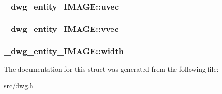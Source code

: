 \hypertarget{struct__dwg__entity__IMAGE_ab37550b0d4eb6c4e1899fd327a4c7917}{
\subsubsection[{uvec}]{ {\bf \-\_\-dwg\-\_\-entity\-\_\-\-I\-M\-A\-G\-E\-::uvec}}}\label{struct__dwg__entity__IMAGE_ab37550b0d4eb6c4e1899fd327a4c7917}
\hypertarget{struct__dwg__entity__IMAGE_a4cdf679c7f260a8799bbb15a80fde48f}{
\subsubsection[{vvec}]{ {\bf \-\_\-dwg\-\_\-entity\-\_\-\-I\-M\-A\-G\-E\-::vvec}}}\label{struct__dwg__entity__IMAGE_a4cdf679c7f260a8799bbb15a80fde48f}
\hypertarget{struct__dwg__entity__IMAGE_a0763c6bfe34e8fb7946b4811ba1230c8}{
\subsubsection[{width}]{ {\bf \-\_\-dwg\-\_\-entity\-\_\-\-I\-M\-A\-G\-E\-::width}}}\label{struct__dwg__entity__IMAGE_a0763c6bfe34e8fb7946b4811ba1230c8}


\-The documentation for this struct was generated from the following file\-:\begin{DoxyCompactItemize}
\item 
src/\hyperlink{dwg_8h}{dwg.\-h}\end{DoxyCompactItemize}
